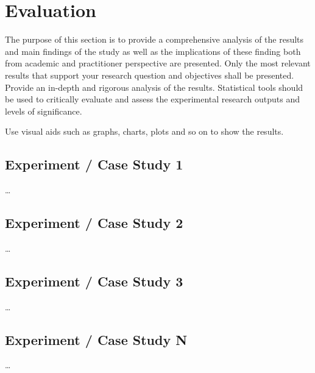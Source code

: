 
\section{Evaluation}
\label{sec:Evaluation}

The purpose of this section is to provide a comprehensive analysis of the results and main findings of the study as well as the implications of these finding both from academic and practitioner perspective are presented. Only the most relevant results that support your research question and objectives shall be presented. Provide an in-depth and rigorous analysis of the results. Statistical tools should be used to critically evaluate and assess the experimental research outputs and levels of significance.

Use visual aids such as graphs, charts, plots and so on to show the results.



\subsection{Experiment / Case Study 1}
\label{sec:evalOne}

\dots


\subsection{Experiment / Case Study 2}
\label{sec:evalTwo}

\dots


\subsection{Experiment / Case Study 3}
\label{sec:evalThree}

\dots


\subsection{Experiment / Case Study N}
\label{sec:evalN}

\dots


